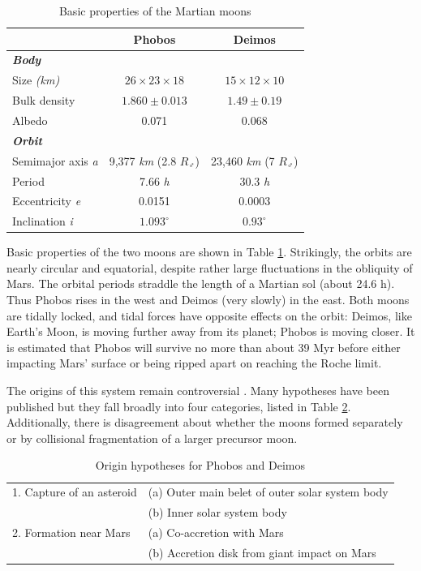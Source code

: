 \begin{table}[hbt!]
	\centering %
	\caption{Basic properties of the Martian moons}
	\label{table:properties}
	\small
	\begin{tabular}{|l|c|c|}
		\hline
		 & \textbf{Phobos} & \textbf{Deimos} \\
		\hline
		\textbf{\textit{Body}} &  & \\
		Size \textit{(km)} & $26 \times 23 \times 18$ & $15 \times 12 \times 10$ \\
		Bulk density & $1.860 \pm 0.013$ & $1.49 \pm 0.19$ \\
		Albedo & 0.071 & 0.068 \\
		\hline
		\textbf{\textit{Orbit}} &  & \\
		Semimajor axis \textit{a} & 9,377 \textit{km} (2.8 $R_\Mars$) & 23,460 \textit{km} (7 $R_\Mars$) \\
		Period & 7.66 \textit{h} & 30.3 \textit{h} \\
		Eccentricity \textit{e} & 0.0151 & 0.0003 \\
		Inclination \textit{i} & $1.093^\circ$ &  $0.93^\circ$ \\
		\hline
	\end{tabular}
\end{table}

Basic properties of the two moons are shown in Table \ref{table:properties}. Strikingly, the orbits are nearly circular and equatorial, despite rather large fluctuations in the obliquity of Mars. The orbital periods straddle the length of a Martian sol (about 24.6 h). Thus Phobos rises in the west and Deimos (very slowly) in the east. Both moons are tidally locked, and tidal forces have opposite effects on the orbit: Deimos, like Earth's Moon, is moving further away from its planet; Phobos is moving closer. It is estimated that Phobos will survive no more than about 39 Myr before either impacting Mars' surface or being ripped apart on reaching the Roche limit.

The origins of this system remain controversial \citep{ramsley_origins_2021}. Many hypotheses have been published but they fall broadly into four categories, listed in Table \ref{table:hypoths}. Additionally, there is disagreement about whether the moons formed separately or by collisional fragmentation of a larger precursor moon.

\begin{table}[hbt!]
	\centering %
	\caption{Origin hypotheses for Phobos and Deimos}
	\label{table:hypoths}
	\small
	\begin{tabular}{|l l|}
		\hline
		1. Capture of an asteroid & (a) Outer main belet of outer solar system body \\
		& (b) Inner solar system body  \\
		\hline
		2. Formation near Mars & (a) Co-accretion with Mars \\
		& (b) Accretion disk from giant impact on Mars \\
		\hline
	\end{tabular}
\end{table}


